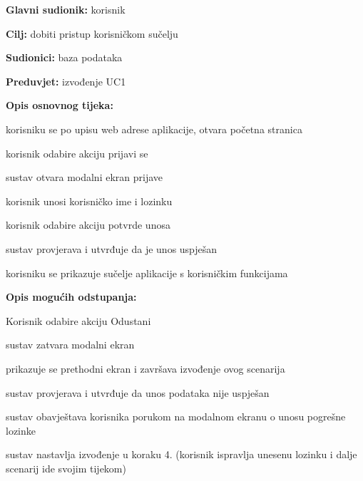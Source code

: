                    \noindent {}
					\begin{packed_item}
	
						\item \textbf{Glavni sudionik: }korisnik
						\item  \textbf{Cilj: }dobiti pristup korisničkom sučelju
						\item  \textbf{Sudionici: }baza podataka
						\item  \textbf{Preduvjet: } izvođenje UC1
						\item  \textbf{Opis osnovnog tijeka:}
						
						\item[] \begin{packed_enum}
							\item korisniku se po upisu web adrese aplikacije, otvara početna stranica
							\item korisnik odabire akciju prijavi se
							\item sustav otvara modalni ekran prijave
							\item korisnik unosi korisničko ime i lozinku
							\item korisnik odabire akciju potvrde unosa
							\item sustav provjerava i utvrđuje da je unos uspješan
							\item korisniku se prikazuje sučelje aplikacije s korisničkim funkcijama

						\end{packed_enum}
						
						\item  \textbf{Opis mogućih odstupanja:}
						
						\item[] \begin{packed_item}
							\item[5.a] Korisnik odabire akciju Odustani
							\item[] 
							\begin{packed_enum} 
								\item sustav zatvara modalni ekran
								\item prikazuje se prethodni ekran i završava izvođenje ovog scenarija
							\end{packed_enum}
							\item[6.a]  sustav provjerava i utvrđuje da unos podataka nije uspješan
							\item[] 
							\begin{packed_enum}
								\item sustav obavještava korisnika porukom na modalnom ekranu o unosu pogrešne lozinke
								\item sustav nastavlja izvođenje u koraku 4. (korisnik ispravlja unesenu lozinku i dalje scenarij ide svojim tijekom)
							\end{packed_enum}
							
						\end{packed_item}
					\end{packed_item}

